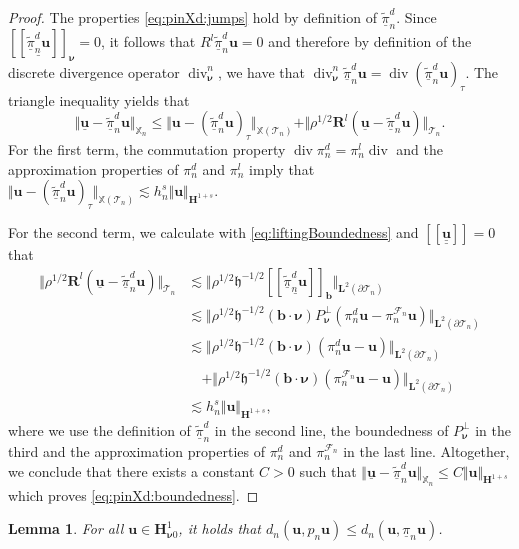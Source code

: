 \documentclass{m2an}
\newcommand{\nv}{\boldsymbol{\nu}}
\newcommand{\bflow}{\mathbf{b}}
\renewcommand{\u}{\mathbf{u}}
\renewcommand{\div}{\operatorname{div}}
\newcommand{\calT}{\mathcal{T}}
\newcommand{\X}{\mathbb{X}}
\newcommand{\Xn}{\mathbb{X}_n}
\newcommand{\bH}{{\mathbf H}}
\newcommand{\bRl}{\mathbf{R}^{\!l}}
\newcommand{\bL}{\mathbf{L}}
\newcommand{\hdgjump}[1]{[\![\underline{#1} ]\!]}
\newcommand{\Tn}{\calT_n}
\newcommand{\ddiv}{\div_{\nv}^n}
\newcommand{\Fn}{\mathcal{F}_n}
\newcommand{\PVol}[1]{(#1)_{\tau}}
\newcommand{\pinX}{\underline{\pi}_n}
\newcommand{\pinXd}{\underline{\tilde{\pi}}_n^d}
\newcommand{\h}{\mathfrak{h}}
\theoremstyle{plain}
\newtheorem{lemma}[theorem]{Lemma}
\theoremstyle{definition}
\begin{document}
\begin{proof}
   The properties \eqref{eq:pinXd:jumps} hold by definition of $\pinXd$. Since $\hdgjump{\pinXd \u}_{\nv} = 0$, it follows that $R^l \pinXd \u = 0$ and therefore by definition of the discrete divergence operator $\ddiv$, we have that $\ddiv \pinXd \u = \div \PVol{\pinXd \u}$. The triangle inequality yields that 
   \begin{equation*}
      \Vert \underline{\u} - \pinXd \u \Vert_{\Xn} \le \Vert \u - \PVol{\pinXd \u} \Vert_{\X(\Tn)} + \Vert \rho^{1/2} \bRl (\underline{\u} -\pinXd \u) \Vert_{\Tn}. 
   \end{equation*}
   For the first term, the commutation property $\div \pi_n^d = \pi_n^l \div$ and the approximation properties of $\pi_n^d$ and $\pi_n^l$ imply that $\Vert \u - \! \PVol{\pinXd \u} \! \Vert_{\X(\Tn)} \! \lesssim \! h^s_n \Vert \u \Vert_{\bH^{1+s}}$. 
   
   For the second term, we calculate with \eqref{eq:liftingBoundedness} and $\hdgjump{\underline{\u}} = 0$ that 
   \begin{equation}\label{eq:pinXd:RBoundedness}
      \begin{aligned}
         \Vert \rho^{1/2} \bRl (\underline{\u} - \pinXd \u) \Vert_{\Tn} &\lesssim \Vert \rho^{1/2} \h^{-1/2} \hdgjump{\pinXd \u}_{\bflow} \Vert_{\bL^2(\partial \Tn)} \\
		   &\lesssim \Vert \rho^{1/2} \h^{-1/2} (\bflow \cdot \nv) P_{\nv}^{\perp}(\pi_n^d \u - \pi_n^{\Fn}\u) \Vert_{\bL^2(\partial \Tn)}\\
		   &\lesssim \Vert \rho^{1/2} \h^{-1/2} (\bflow \cdot \nv)(\pi_n^d \u - \u) \Vert_{\bL^2(\partial \Tn)} \\
         &\quad + \Vert \rho^{1/2} \h^{-1/2} (\bflow \cdot \nv)(\pi_n^{\Fn} \u - \u) \Vert_{\bL^2(\partial \Tn)}\\
         &\lesssim h^s_n \Vert \u \Vert_{\bH^{1+s}},
      \end{aligned}
   \end{equation}
   where we use the definition of $\pinXd$ in the second line, the boundedness of $P_{\nv}^{\perp}$ in the third and the approximation properties of $\pi_n^d$ and $\pi_n^{\Fn}$ in the last line. Altogether, we conclude that there exists a constant $C > 0$ such that $\Vert \underline{\u} - \pinXd \u \Vert_{\Xn} \le C \Vert \u \Vert_{\bH^{1+s}}$ which proves \eqref{eq:pinXd:boundedness}.
\end{proof}

\begin{lemma}\label{lem:pnBoundedBypinX}
   For all $\u \in \bH^{1}_{\nv 0}$, it holds that $d_n(\u,p_n \u) \le d_n(\u,\pinX \u)$.
\end{lemma}
\end{document}
